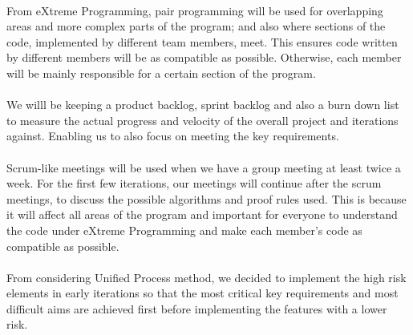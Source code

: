 \paragraph{}
From eXtreme Programming, pair programming will be used for overlapping areas and more complex parts of the program; and also where sections of the code, implemented by different team members, meet. This ensures code written by different members will be as compatible as possible. Otherwise, each member will be mainly responsible for a certain section of the program.

\paragraph{}
We willl be keeping a product backlog, sprint backlog and also a burn down list to measure the actual progress and velocity of the overall project and iterations against. Enabling us to also focus on meeting the key requirements.

\paragraph{}
Scrum-like meetings will be used when we have a group meeting at least twice a week. For the first few iterations, our meetings will continue after the scrum meetings, to discuss the possible algorithms and proof rules used. This is because it will affect all areas of the program and important for everyone to understand the code under eXtreme Programming and make each member's code as compatible as possible.

\paragraph{}
From considering Unified Process method, we decided to implement the high risk elements in early iterations so that the most critical key requirements and most difficult aims are achieved first before implementing the features with a lower risk.